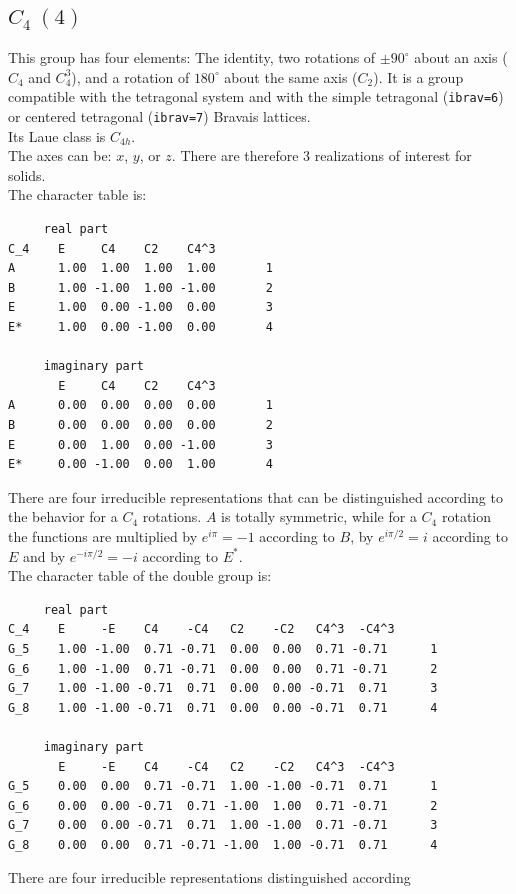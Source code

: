 \documentclass[12pt,a4paper]{article}
\begin{document}
\subsection{\color{web-blue}$C_4\ (4)$}
This group has four elements: The identity, two rotations of $\pm90^\circ$ 
about an axis ($C_4$ and $C_4^3$), and a rotation of $180^\circ$ about the same
axis ($C_2$).
It is a group compatible with the tetragonal system and with the
simple tetragonal (\texttt{ibrav=6}) or centered tetragonal (\texttt{ibrav=7})
Bravais lattices. \\ 
Its Laue class is $C_{4h}$. \\
The axes can be: $x$, $y$, or $z$.
There are therefore $3$ realizations of interest for solids. \\
The character table is:
\begin{verbatim}
     real part
C_4    E     C4    C2    C4^3
A      1.00  1.00  1.00  1.00       1
B      1.00 -1.00  1.00 -1.00       2
E      1.00  0.00 -1.00  0.00       3
E*     1.00  0.00 -1.00  0.00       4

     imaginary part
       E     C4    C2    C4^3
A      0.00  0.00  0.00  0.00       1
B      0.00  0.00  0.00  0.00       2
E      0.00  1.00  0.00 -1.00       3
E*     0.00 -1.00  0.00  1.00       4
\end{verbatim}
There are four irreducible representations that can be distinguished according
to the behavior for a $C_4$ rotations. $A$ is totally symmetric, while for a
$C_4$ rotation the functions are multiplied by $e^{i\pi}=-1$ according to 
$B$, by $e^{i\pi/2}=i$ according to $E$ and by $e^{-i\pi/2}=-i$ according to
$E^*$. \\
The character table of the double group is:
\begin{verbatim}
     real part
C_4    E     -E    C4    -C4   C2    -C2   C4^3  -C4^3
G_5    1.00 -1.00  0.71 -0.71  0.00  0.00  0.71 -0.71      1
G_6    1.00 -1.00  0.71 -0.71  0.00  0.00  0.71 -0.71      2
G_7    1.00 -1.00 -0.71  0.71  0.00  0.00 -0.71  0.71      3
G_8    1.00 -1.00 -0.71  0.71  0.00  0.00 -0.71  0.71      4

     imaginary part
       E     -E    C4    -C4   C2    -C2   C4^3  -C4^3
G_5    0.00  0.00  0.71 -0.71  1.00 -1.00 -0.71  0.71      1
G_6    0.00  0.00 -0.71  0.71 -1.00  1.00  0.71 -0.71      2
G_7    0.00  0.00 -0.71  0.71  1.00 -1.00  0.71 -0.71      3
G_8    0.00  0.00  0.71 -0.71 -1.00  1.00 -0.71  0.71      4
\end{verbatim}
There are four irreducible representations distinguished according
\end{document}
